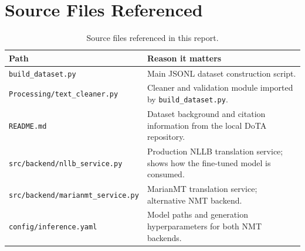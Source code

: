 \documentclass[12pt,a4paper]{article}
\begin{document}
\section{Source Files Referenced}

\begin{table}[H]
\centering
\caption{Source files referenced in this report.}
\label{tab:source-files}
\renewcommand{\arraystretch}{1.25}
\begin{tabularx}{\linewidth}{lX}
\toprule
\textbf{Path} & \textbf{Reason it matters} \\
\midrule
\texttt{build\_dataset.py}              & Main JSONL dataset construction script. \\
\texttt{Processing/text\_cleaner.py}    & Cleaner and validation module imported by \texttt{build\_dataset.py}. \\
\texttt{README.md}                      & Dataset background and citation information from the local DoTA repository. \\
\texttt{src/backend/nllb\_service.py}   & Production NLLB translation service; shows how the fine-tuned model is consumed. \\
\texttt{src/backend/marianmt\_service.py} & MarianMT translation service; alternative NMT backend. \\
\texttt{config/inference.yaml}          & Model paths and generation hyperparameters for both NMT backends. \\
\bottomrule
\end{tabularx}
\end{table}
\end{document}
